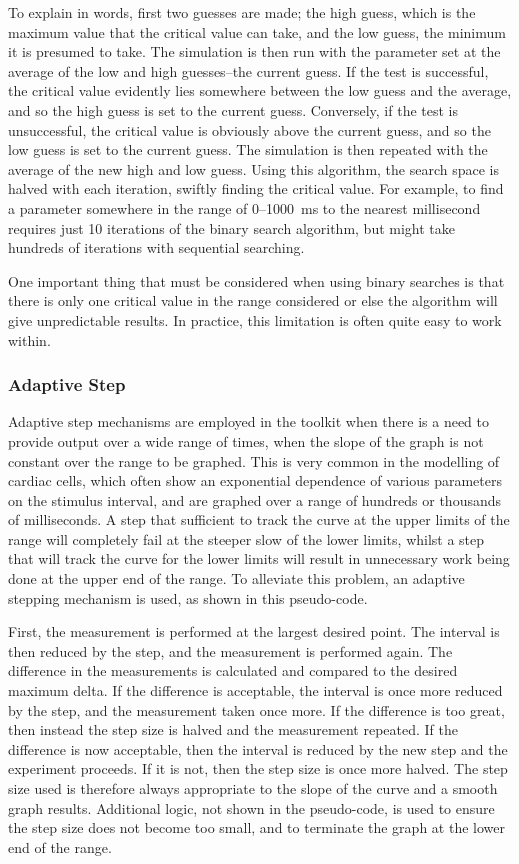 To explain in words, first two guesses are made; the high guess, which is the
maximum value that the critical value can take, and the low guess, the minimum
it is presumed to take.  The simulation is then run with the parameter set at
the average of the low and high guesses--the current guess.  If the test is
successful, the critical value evidently lies somewhere between the low guess
and the average, and so the high guess is set to the current guess.  Conversely,
if the test is unsuccessful, the critical value is obviously above the current
guess, and so the low guess is set to the current guess.  The simulation is then
repeated with the average of the new high and low guess.  Using this algorithm,
the search space is halved with each iteration, swiftly finding the critical
value.  For example, to find a parameter somewhere in the range of 0--1000~ms to
the nearest millisecond requires just 10 iterations of the binary search
algorithm, but might take hundreds of iterations with sequential searching.

One important thing that must be considered when using binary searches is that
there is only one critical value in the range considered or else the algorithm
will give unpredictable results.  In practice, this limitation is often quite
easy to work within.

\subsubsection{Adaptive Step}

Adaptive step mechanisms are employed in the toolkit when there is a need to
provide output over a wide range of times, when the slope of the graph is not
constant over the range to be graphed.  This is very common in the modelling of
cardiac cells, which often show an exponential dependence of various parameters
on the  stimulus interval, and are graphed over a range of hundreds or thousands
of milliseconds.  A step that sufficient to track the curve at the upper limits
of the range will completely fail at the steeper slow of the lower limits,
whilst a step that will track the curve for the lower limits will result in
unnecessary work being done at the upper end of the range.  To alleviate this
problem, an adaptive stepping mechanism is used, as shown in this pseudo-code.

First, the measurement is performed at the largest desired point.  The interval
is then reduced by the step, and the measurement is performed again.  The
difference in the measurements is calculated and compared to the desired maximum
delta.  If the difference is acceptable, the interval is once more reduced by
the step, and the measurement taken once more.  If the difference is too great,
then instead the step size is halved and the measurement repeated.  If the
difference is now acceptable, then the interval is reduced by the new step and
the experiment proceeds.  If it is not, then the step size is once more halved.
The step size used is therefore always appropriate to the slope of the curve and
a smooth graph results.  Additional logic, not shown in the pseudo-code, is used
to ensure the step size does not become too small, and to terminate the graph at
the lower end of the range.

